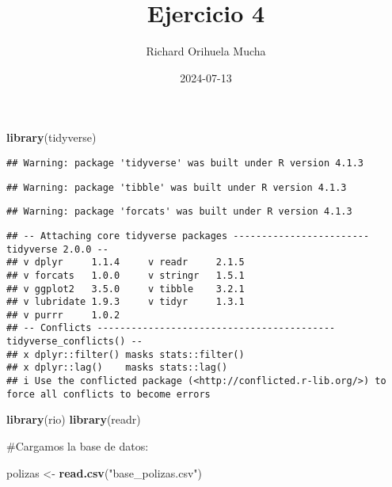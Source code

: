 \documentclass[
]{article}
\title{Ejercicio 4}
\author{Richard Orihuela Mucha}
\date{2024-07-13}
\newenvironment{Shaded}{\begin{snugshade}}{\end{snugshade}}
\newcommand{\FunctionTok}[1]{\textcolor[rgb]{0.13,0.29,0.53}{\textbf{#1}}}
\newcommand{\NormalTok}[1]{#1}
\newcommand{\OtherTok}[1]{\textcolor[rgb]{0.56,0.35,0.01}{#1}}
\newcommand{\StringTok}[1]{\textcolor[rgb]{0.31,0.60,0.02}{#1}}
\begin{document}
\maketitle

\begin{Shaded}
\begin{Highlighting}[]
\FunctionTok{library}\NormalTok{(tidyverse)}
\end{Highlighting}
\end{Shaded}

\begin{verbatim}
## Warning: package 'tidyverse' was built under R version 4.1.3
\end{verbatim}

\begin{verbatim}
## Warning: package 'tibble' was built under R version 4.1.3
\end{verbatim}

\begin{verbatim}
## Warning: package 'forcats' was built under R version 4.1.3
\end{verbatim}

\begin{verbatim}
## -- Attaching core tidyverse packages ------------------------ tidyverse 2.0.0 --
## v dplyr     1.1.4     v readr     2.1.5
## v forcats   1.0.0     v stringr   1.5.1
## v ggplot2   3.5.0     v tibble    3.2.1
## v lubridate 1.9.3     v tidyr     1.3.1
## v purrr     1.0.2     
## -- Conflicts ------------------------------------------ tidyverse_conflicts() --
## x dplyr::filter() masks stats::filter()
## x dplyr::lag()    masks stats::lag()
## i Use the conflicted package (<http://conflicted.r-lib.org/>) to force all conflicts to become errors
\end{verbatim}

\begin{Shaded}
\begin{Highlighting}[]
\FunctionTok{library}\NormalTok{(rio)}
\FunctionTok{library}\NormalTok{(readr)}
\end{Highlighting}
\end{Shaded}

\#Cargamos la base de datos:

\begin{Shaded}
\begin{Highlighting}[]
\NormalTok{polizas }\OtherTok{\textless{}{-}} \FunctionTok{read.csv}\NormalTok{(}\StringTok{"base\_polizas.csv"}\NormalTok{)}
\end{Highlighting}
\end{Shaded}
\end{document}
